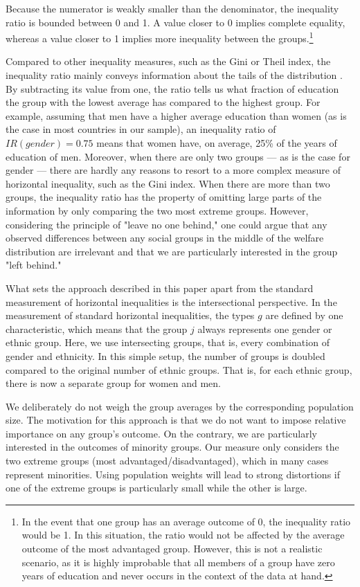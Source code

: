Because the numerator is weakly smaller than the denominator, the inequality ratio is bounded between 0 and 1. A value closer to 0 implies complete equality, whereas a value closer to 1 implies more inequality between the groups.\footnote{In the event that one group has an average outcome of 0, the inequality ratio would be 1. In this situation, the ratio would not be affected by the average outcome of the most advantaged group. However, this is not a realistic scenario, as it is highly improbable that all members of a group have zero years of education and never occurs in the context of the data at hand.}

Compared to other inequality measures, such as the Gini or Theil index, the inequality ratio mainly conveys information about the tails of the distribution \citep{Conceicao2000, Cobham2013}. By subtracting its value from one, the ratio tells us what fraction of education the group with the lowest average has compared to the highest group. For example, assuming that men have a higher average education than women (as is the case in most countries in our sample), an inequality ratio of $IR(gender)=0.75$ means that women have, on average, 25\% of the years of education of men. Moreover, when there are only two groups --- as is the case for gender --- there are hardly any reasons to resort to a more complex measure of horizontal inequality, such as the Gini index. When there are more than two groups, the inequality ratio has the property of omitting large parts of the information by only comparing the two most extreme groups. However, considering the principle of "leave no one behind," one could argue that any observed differences between any social groups in the middle of the welfare distribution are irrelevant and that we are particularly interested in the group "left behind." 

What sets the approach described in this paper apart from the standard measurement of horizontal inequalities is the intersectional perspective. In the measurement of standard horizontal inequalities, the types $g$ are defined by one characteristic, which means that the group $j$ always represents one gender or ethnic group. Here, we use intersecting groups, that is, every combination of gender and ethnicity. In this simple setup, the number of groups is doubled compared to the original number of ethnic groups. That is, for each ethnic group, there is now a separate group for women and men.

We deliberately do not weigh the group averages by the corresponding population size. The motivation for this approach is that we do not want to impose relative importance on any group's outcome. On the contrary, we are particularly interested in the outcomes of minority groups. Our measure only considers the two extreme groups (most advantaged/disadvantaged), which in many cases represent minorities. Using population weights will lead to strong distortions if one of the extreme groups is particularly small while the other is large. 

